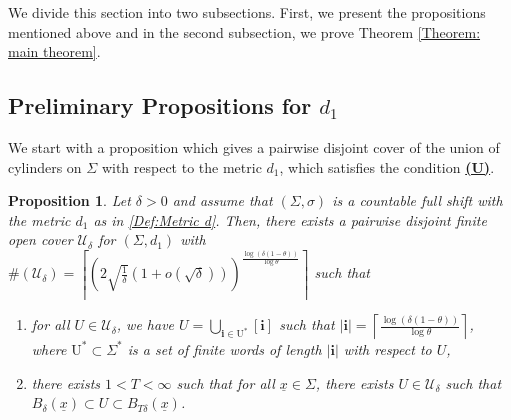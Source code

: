 \documentclass[11pt, reqno]{amsart}
\theoremstyle{plain}%
\newtheorem{proposition}[theorem]{Proposition}
\theoremstyle{definition}
\theoremstyle{definition}
\def\U{\ensuremath{\mathcal U}}
\def\st{such that }
\def\ulx{\underline{x}}
\numberwithin{equation}{section}
\begin{document}
We divide this section into two subsections. First, we present the propositions mentioned above and in the second subsection, we prove Theorem \ref{Theorem: main theorem}. %

\subsection{Preliminary Propositions for $d_1$}\label{subsection: PP for d_1}

We start with a proposition which gives a pairwise disjoint cover of the union of cylinders on $\Sigma$ with respect to the metric $d_1$, which satisfies the condition \hyperref[Condition (U)]{\textbf{(U)}}.  
\begin{proposition}\label{Lemma:Totally bounded in Full shift}
    Let $\delta>0$ and assume that $(\Sigma,\sigma)$ is a countable full shift with the metric $d_1$ as in \eqref{Def:Metric d}. Then, there exists a pairwise disjoint finite open cover $\U_{\delta}$ for $(\Sigma,d_1)$ with $\#(\U_{\delta})=\left\lceil\left(2\sqrt{\frac{1}{\delta}}\left(1+o\left(\sqrt{\delta}\right)\right)\right) ^ { \frac{\log(\delta(1-\theta))}{\log\theta}}\right\rceil$ \st
\begin{enumerate}
    \item for all $U\in \U_{\delta}$, we have $U=\bigcup_{\mathbf{i}\in \mathrm{U^*}}[\mathbf{i}]$ \st $|\mathbf{i}|= \left\lceil\frac{\log(\delta(1-\theta))}{\log\theta}\right\rceil$, where $\mathrm{U^*}\subset\Sigma^*$ is a set of finite words of length $|\mathbf{i}|$ with respect to $U$,
    \item there exists $1<T<\infty$ \st for all $\ulx\in \Sigma$, there exists $U\in\U_\delta$ \st $B_{\delta}(\ulx)\subset U\subset B_{T\delta}(\ulx)$.
\end{enumerate}
 

    


    
\end{proposition}
\end{document}
